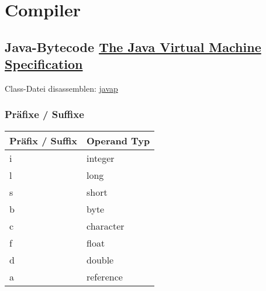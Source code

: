 \chapter{Compiler}
\section{Java-Bytecode \href{https://docs.oracle.com/javase/specs/jvms/se10/jvms10.pdf}{The Java Virtual Machine Specification}}

Class-Datei disassemblen: \href{https://docs.oracle.com/javase/7/docs/technotes/tools/windows/javap.html}{javap}

\subsection{Präfixe / Suffixe}
\begin{table}[h]
	\centering
	\label{my-label}
	\begin{tabular}{l|l}
		Präfix / Suffix	& Operand Typ\\ \hline
		i	&	integer		\\ \hline
		l	&	long		\\ \hline
		s	&	short		\\ \hline
		b	&	byte		\\ \hline
		c	&	character	\\ \hline
		f	&	float		\\ \hline
		d	&	double		\\ \hline
		a	&	reference	\\
	\end{tabular}
\end{table}
